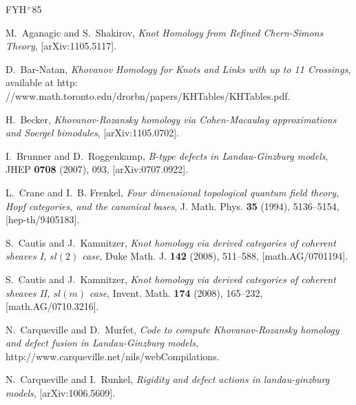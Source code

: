 \documentclass{compositio}
\theoremstyle{definition}
\numberwithin{equation}{section}
\begin{document}
%
%


\newcommand{\etalchar}[1]{$^{#1}$}
\providecommand{\href}[2]{#2}
\begin{thebibliography}{FYH{\etalchar{+}}85}

M.~Aganagic and S.~Shakirov, \emph{Knot {H}omology from {R}efined
  {C}hern-{S}imons {T}heory},
  \href{http://arxiv.org/abs/1105.5117}{[arXiv:1105.5117]}.

D.~Bar-Natan, \emph{Khovanov {H}omology for {K}nots and {L}inks with up to 11
  {C}rossings}, available at
  \href{http://www.math.toronto.edu/drorbn/papers/KHTables/KHTables.pdf}{http:%
//www.math.toronto.edu/drorbn/papers/KHTables/KHTables.pdf}.

H.~Becker, \emph{Khovanov-Rozansky homology via Cohen-Macaulay approximations and Soergel bimodules},
  \href{http://arxiv.org/abs/1105.0702}{[arXiv:1105.0702]}.

I.~Brunner and D.~Roggenkamp, \emph{B-type defects in {L}andau-{G}inzburg
  models}, JHEP \textbf{0708} (2007), 093,
  \href{http://arxiv.org/abs/0707.0922}{[arXiv:0707.0922]}.

L.~Crane and I.~B. Frenkel, \emph{Four dimensional topological quantum field
  theory, {H}opf categories, and the canonical bases}, J. Math. Phys.
  \textbf{35} (1994), 5136--5154,
  \href{http://arxiv.org/abs/hep-th/9405183}{[hep-th/9405183]}.

S.~Cautis and J.~Kamnitzer, \emph{Knot homology via derived categories of
  coherent sheaves {I}, {$sl(2)$} case}, Duke Math. J. \textbf{142} (2008),
  511--588, \href{http://arxiv.org/abs/math/0701194}{[math.AG/0701194]}.

S.~Cautis and J.~Kamnitzer, \emph{Knot homology via derived categories of coherent sheaves {II},
  {$sl(m)$} case}, Invent. Math. \textbf{174} (2008), 165--232,
  \href{http://arxiv.org/abs/math/0710.3216}{[math.AG/0710.3216]}.

N.~Carqueville and D.~Murfet, \emph{Code to compute {K}hovanov-{R}ozansky
  homology and defect fusion in {L}andau-{G}inzburg models},
  \href{http://www.carqueville.net/nils/webCompilations}{http://www.carqueville.net/nils/webCompilations}.

N.~Carqueville and I.~Runkel, \emph{Rigidity and defect actions in
  landau-ginzburg models},
  \href{http://arxiv.org/abs/1006.5609}{[arXiv:1006.5609]}.


\end{thebibliography}
\end{document}

